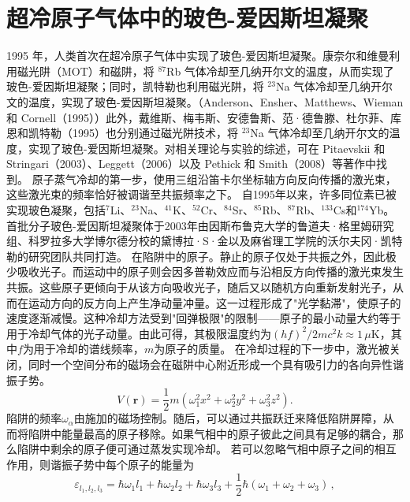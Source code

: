 \section{超冷原子气体中的玻色-爱因斯坦凝聚}\label{sec:7_2_bec_ultracold}
1995 年，人类首次在超冷原子气体中实现了玻色-爱因斯坦凝聚。康奈尔和维曼利用磁光阱（MOT）和磁阱，将 \(^{87}\)Rb 气体冷却至几纳开尔文的温度，从而实现了玻色-爱因斯坦凝聚；同时，凯特勒也利用磁光阱，将 \(^{23}\)Na 气体冷却至几纳开尔文的温度，实现了玻色-爱因斯坦凝聚。（Anderson、Ensher、Matthews、Wieman 和 Cornell（1995））此外，戴维斯、梅韦斯、安德鲁斯、范·德鲁滕、杜尔菲、库恩和凯特勒（1995）也分别通过磁光阱技术，将 \(^{23}\)Na 气体冷却至几纳开尔文的温度，实现了玻色-爱因斯坦凝聚。对相关理论与实验的综述，可在 Pitaevskii 和 Stringari（2003）、Leggett（2006）以及 Pethick 和 Smith（2008）等著作中找到。
原子蒸气冷却的第一步，使用三组沿笛卡尔坐标轴方向反向传播的激光束，这些激光束的频率恰好被调谐至共振频率之下。
自1995年以来，许多同位素已被实现玻色凝聚，包括\(^{7}\)Li、\(^{23}\)Na、\(^{41}\)K、\(^{52}\)Cr、\(^{84}\)Sr、\(^{85}\)Rb、\(^{87}\)Rb、\(^{133}\)Cs和\(^{174}\)Yb。首批分子玻色-爱因斯坦凝聚体于2003年由因斯布鲁克大学的鲁道夫·格里姆研究组、科罗拉多大学博尔德分校的黛博拉·S·金以及麻省理工学院的沃尔夫冈·凯特勒的研究团队共同打造。
在陷阱中的原子。静止的原子仅处于共振之外，因此极少吸收光子。而运动中的原子则会因多普勒效应而与沿相反方向传播的激光束发生共振。这些原子更倾向于从该方向吸收光子，随后又以随机方向重新发射光子，从而在运动方向的反方向上产生净动量冲量。这一过程形成了"光学黏滞"，使原子的速度逐渐减慢。这种冷却方法受到"回弹极限"的限制——原子的最小动量大约等于用于冷却气体的光子动量。由此可得，其极限温度约为\((hf)^2/2mc^2k \approx 1\,\mu\)K，其中\(f\)为用于冷却的谱线频率，\(m\)为原子的质量。
在冷却过程的下一步中，激光被关闭，同时一个空间分布的磁场会在磁阱中心附近形成一个具有吸引力的各向异性谐振子势。
\begin{equation}\tag{7.1.52}\label{eq:7.1.52}
V ( \pmb { r } ) = \frac { 1 } { 2 } m \left( \omega _ { 1 } ^{2} x ^{2} + \omega _ { 2 } ^{2} y ^{2} + \omega _ { 3 } ^{2} z ^{2} \right) .
\end{equation}
陷阱的频率\(\omega_{\alpha}\)由施加的磁场控制。随后，可以通过共振跃迁来降低陷阱屏障，从而将陷阱中能量最高的原子移除。如果气相中的原子彼此之间具有足够的耦合，那么陷阱中剩余的原子便可通过蒸发实现冷却。
若可以忽略气相中原子之间的相互作用，则谐振子势中每个原子的能量为
\begin{equation}\tag{7.1.53}\label{eq:7.1.53}
\varepsilon _ { l _ { 1 } , l _ { 2 } , l _ { 3 } } = \hbar \omega _ { 1 } l _ { 1 } + \hbar \omega _ { 2 } l _ { 2 } + \hbar \omega _ { 3 } l _ { 3 } + \frac { 1 } { 2 } \hbar ( \omega _ { 1 } + \omega _ { 2 } + \omega _ { 3 } ) \, ,
\end{equation}

